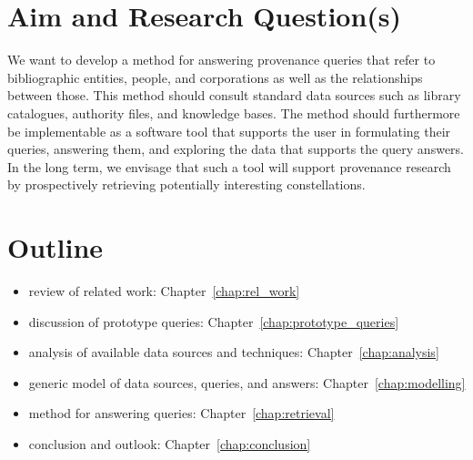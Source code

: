 

\section{Aim and Research Question(s)}
\label{sec:research_questions}


We want to develop a method for answering provenance queries that refer to bibliographic entities, people, and corporations
as well as the relationships between those. This method should consult standard data sources such as 
library catalogues, authority files, and knowledge bases. The method should furthermore be implementable as a software tool
that supports the user in formulating their queries, answering them, and exploring the data that supports the query answers.
In the long term, we envisage that such a tool will support provenance research
by prospectively retrieving potentially interesting constellations.

\section{Outline}
\label{sec:outline}

\begin{itemize}
  \item
    review of related work: Chapter~\ref{chap:rel_work}
  \item
    discussion of prototype queries: Chapter~\ref{chap:prototype_queries}
  \item
    analysis of available data sources and techniques: Chapter~\ref{chap:analysis}
  \item
    generic model of data sources, queries, and answers: Chapter~\ref{chap:modelling}
  \item
    method for answering queries: Chapter~\ref{chap:retrieval}
  \item
    conclusion and outlook: Chapter~\ref{chap:conclusion}
\end{itemize}


